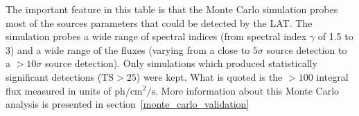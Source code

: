 \documentclass[12pt,preprint]{aastex}
\newcommand{\mev}{\text{MeV}\xspace}
\newcommand{\ph}{\text{ph}\xspace}
\newcommand{\cm}{\text{cm}\xspace}
\renewcommand{\sec}{\text{s}\xspace}
\newcommand{\ts}{\text{TS}\xspace}
\begin{document}
\begin{table}
\begin{centering}
{    The important feature in this table is that the Monte Carlo
    simulation probes most of the sources parameters that could be detected
    by the LAT.  The simulation probes a wide range of spectral indices
    (from spectral index $\gamma$ of 1.5 to 3) and a wide range of the fluxes
    (varying from a close to $5\sigma$ source detection to a $>10\sigma$
    source detection).  Only simulations which produced statistically
    significant detections ($\ts>25$) were kept.  What is quoted is the
    $>100$ \mev integral flux measured in units of $\ph/\cm^2/\sec$.
    More information about this Monte Carlo analysis is presented in
    section~\ref{monte_carlo_validation}
    }
    \label{ts_ext_num_sims}
  \end{centering}
\end{table}

\clearpage
\end{document}
